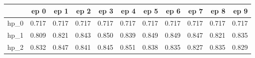 \begin{tabular}{lrrrrrrrrrr}
\toprule
{} &   ep 0 &   ep 1 &   ep 2 &   ep 3 &   ep 4 &   ep 5 &   ep 6 &   ep 7 &   ep 8 &   ep 9 \\
\midrule
hp\_0 &  0.717 &  0.717 &  0.717 &  0.717 &  0.717 &  0.717 &  0.717 &  0.717 &  0.717 &  0.717 \\
hp\_1 &  0.809 &  0.821 &  0.843 &  0.850 &  0.839 &  0.849 &  0.849 &  0.847 &  0.821 &  0.835 \\
hp\_2 &  0.832 &  0.847 &  0.841 &  0.845 &  0.851 &  0.838 &  0.835 &  0.827 &  0.835 &  0.829 \\
\bottomrule
\end{tabular}
